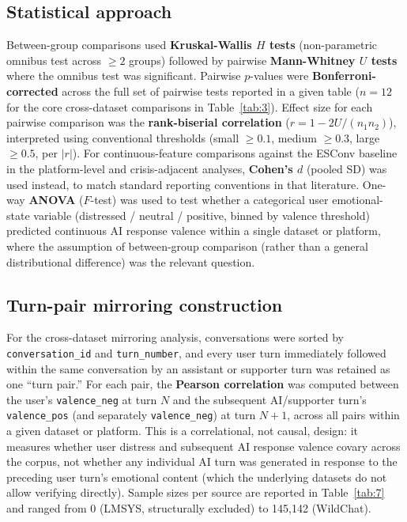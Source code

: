 \documentclass[11pt]{article}
\begin{document}
\subsection{Statistical approach}

Between-group comparisons used \textbf{Kruskal-Wallis $H$ tests} (non-parametric omnibus test across $\geq 2$ groups) followed by pairwise \textbf{Mann-Whitney $U$ tests} where the omnibus test was significant. Pairwise $p$-values were \textbf{Bonferroni-corrected} across the full set of pairwise tests reported in a given table ($n = 12$ for the core cross-dataset comparisons in Table~\ref{tab:3}). Effect size for each pairwise comparison was the \textbf{rank-biserial correlation} ($r = 1 - 2U/(n_1 n_2)$), interpreted using conventional thresholds (small $\geq 0.1$, medium $\geq 0.3$, large $\geq 0.5$, per $|r|$). For continuous-feature comparisons against the ESConv baseline in the platform-level and crisis-adjacent analyses, \textbf{Cohen's $d$} (pooled SD) was used instead, to match standard reporting conventions in that literature. One-way \textbf{ANOVA} ($F$-test) was used to test whether a categorical user emotional-state variable (distressed / neutral / positive, binned by valence threshold) predicted continuous AI response valence within a single dataset or platform, where the assumption of between-group comparison (rather than a general distributional difference) was the relevant question.

\subsection{Turn-pair mirroring construction}

For the cross-dataset mirroring analysis, conversations were sorted by \texttt{conversation\_id} and \texttt{turn\_number}, and every user turn immediately followed within the same conversation by an assistant or supporter turn was retained as one ``turn pair.'' For each pair, the \textbf{Pearson correlation} was computed between the user's \texttt{valence\_neg} at turn $N$ and the subsequent AI/supporter turn's \texttt{valence\_pos} (and separately \texttt{valence\_neg}) at turn $N+1$, across all pairs within a given dataset or platform. This is a correlational, not causal, design: it measures whether user distress and subsequent AI response valence covary across the corpus, not whether any individual AI turn was generated in response to the preceding user turn's emotional content (which the underlying datasets do not allow verifying directly). Sample sizes per source are reported in Table~\ref{tab:7} and ranged from 0 (LMSYS, structurally excluded) to 145{,}142 (WildChat).
\end{document}
